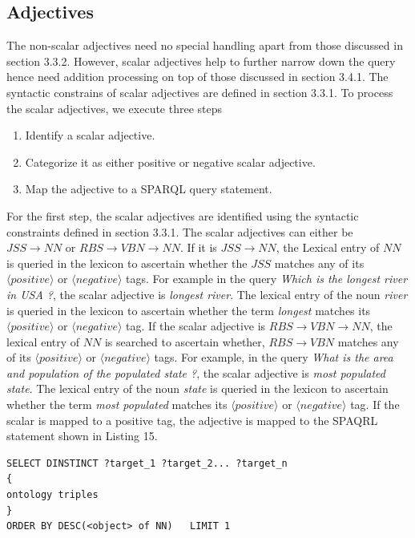 \documentclass[review]{elsarticle}
\begin{document}
\subsection{Adjectives}
The non-scalar adjectives need no special handling apart from those discussed in section 3.3.2. However, scalar adjectives help to further narrow down the query hence need addition processing on top of those discussed in section 3.4.1.  The syntactic constrains of scalar adjectives are defined in section  3.3.1. To process the scalar adjectives, we execute three steps
\begin{enumerate}
\item Identify a scalar adjective.
\item Categorize it as either positive or negative scalar adjective.
\item Map the adjective to a SPARQL query statement.
\end{enumerate}
For the first step, the scalar adjectives are identified using the syntactic constraints defined in section 3.3.1.  The scalar adjectives can either be 
$JSS\rightarrow NN$ or $RBS\rightarrow VBN\rightarrow NN $. If it is $JSS\rightarrow NN$, the Lexical entry of $NN$ is queried  in the lexicon to ascertain whether the $JSS$ matches any of its $\langle positive\rangle$  or $\langle negative \rangle$ tags. For example in the query \textit{Which is the longest river in USA ?}, the scalar adjective is \textit{longest river}. The  lexical entry of the noun \textit{river} is queried in the lexicon to ascertain whether the term \textit{longest} matches its  $\langle positive\rangle$  or $\langle negative \rangle$ tag.  If the scalar adjective is $RBS\rightarrow VBN\rightarrow NN $, the lexical entry of $NN$ is searched to ascertain whether, $RBS\rightarrow VBN $ matches any of its $\langle positive\rangle$  or $\langle negative \rangle$ tags. For example,  in the query \textit{What is the area and population of the  populated state ?}, the scalar adjective is \textit{most populated state}. The  lexical entry of the noun \textit{state} is queried  in the lexicon to ascertain whether the term \textit{most populated} matches its  $\langle positive\rangle$  or $\langle negative \rangle$ tag.
If the scalar is mapped to a positive tag, the adjective is mapped to the SPAQRL statement shown in Listing 15.
\begin{lstlisting}[caption=SPARQL template for positive scalar adjective ]
SELECT DINSTINCT ?target_1 ?target_2... ?target_n
{
ontology triples
}
ORDER BY DESC(<object> of NN)   LIMIT 1
\end{lstlisting}
\end{document}
